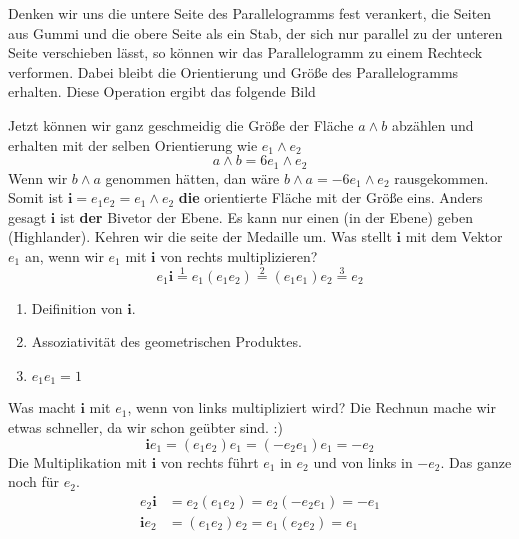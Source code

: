 \documentclass[fleqn]{scrartcl}
\numberwithin{equation}{section}
\def\*#1{\mathbf{#1}}
\begin{document}
Denken wir uns die untere Seite des Parallelogramms fest verankert, die Seiten
aus Gummi und die obere Seite als ein Stab, der sich nur parallel zu der
unteren Seite verschieben lässt, so können wir das Parallelogramm zu einem
Rechteck verformen. Dabei bleibt die Orientierung und Größe des
Parallelogramms erhalten. Diese Operation ergibt das folgende Bild
\begin{center}
\begin{minipage}{\linewidth}
\centering
{}
\captionof{figure}{Der Bivektors $\*i$ in der Ebene}
\label{fig:bivector3}
\end{minipage}
\end{center}
Jetzt können wir ganz geschmeidig die Größe der Fläche $a\wedge b$ abzählen
und erhalten mit der selben Orientierung wie $e_1\wedge e_2$
\[a\wedge b= 6e_1\wedge e_2\]
Wenn wir $b\wedge a$ genommen hätten, dan wäre $b\wedge a = -6e_1\wedge e_2$
rausgekommen. Somit ist $\*i=e_1e_2=e_1\wedge e_2$ \textbf{die} orientierte
Fläche mit der Größe eins. Anders gesagt $\*i$ ist \textbf{der} Bivetor der
Ebene. Es kann nur einen (in der Ebene) geben (Highlander).
\newpage
Kehren wir die seite der Medaille um. Was stellt $\*i$ mit dem Vektor $e_1$
an, wenn wir $e_1$ mit $\*i$ von rechts multiplizieren?
\[e_1\*i\stackrel{1}=e_1(e_1e_2)\stackrel{2}=(e_1e_1)e_2\stackrel{3}=e_2\]
\begin{enumerate}
    \item Deifinition von $\*i$.
    \item Assoziativität des geometrischen Produktes.
    \item $e_1e_1=1$
\end{enumerate}
Was macht $\*i$ mit $e_1$, wenn von links multipliziert wird? Die Rechnun
mache wir etwas schneller, da wir schon geübter sind. :)
\[\*ie_1=(e_1e_2)e_1=(-e_2e_1)e_1=-e_2\]
Die Multiplikation mit $\*i$ von rechts führt $e_1$ in $e_2$ und von links in
$-e_2$. Das ganze noch für $e_2$.
\begin{align*}
    e_2\*i &= e_2(e_1e_2) = e_2(-e_2e_1) = -e_1 \\
    \*ie_2 &= (e_1e_2)e_2 = e_1(e_2e_2) = e_1
\end{align*}
\end{document}
